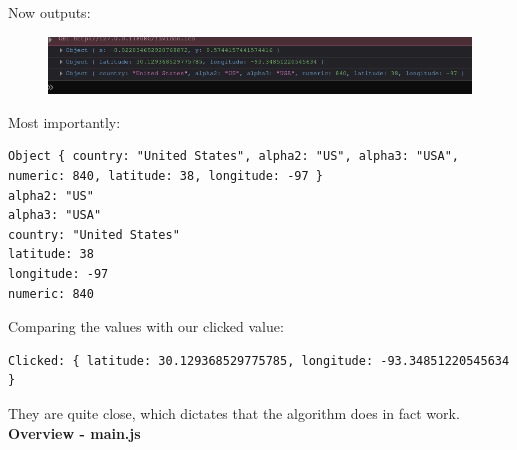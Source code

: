 Now outputs:
\begin{figure}[h]
\centering
\includegraphics[width=0.6\linewidth]{images/closest}
\caption{}
\label{fig:closest}
\end{figure}
Most importantly:
\begin{lstlisting}
Object { country: "United States", alpha2: "US", alpha3: "USA", numeric: 840, latitude: 38, longitude: -97 }
alpha2: "US"
alpha3: "USA"
country: "United States"
latitude: 38
longitude: -97
numeric: 840
\end{lstlisting}
Comparing the values with our clicked value:
\begin{lstlisting}
Clicked: { latitude: 30.129368529775785, longitude: -93.34851220545634 }
\end{lstlisting}
They are quite close, which dictates that the algorithm does in fact work.
\newpage
\textbf{Overview - main.js}
